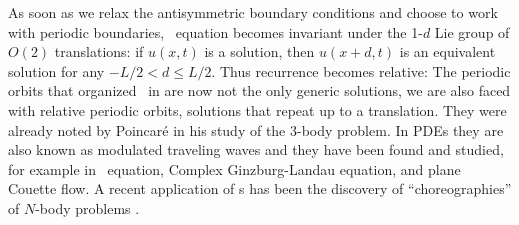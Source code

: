 %
As soon as
we relax the antisymmetric boundary conditions and choose to work with periodic boundaries,
\KS\ equation becomes invariant under the 1-$d$ Lie group of $O(2)$ translations: if
$u(x,t)$ is a solution, then $u(x+d,t)$ is an equivalent
solution for any $-L/2 < d \leq L/2$.
Thus recurrence becomes
relative: The periodic orbits that organized \statesp\ in
 are now not the
only generic  solutions, we are also faced with relative
periodic orbits, solutions that repeat up to a
translation.
They were already noted by Poincar\'e in his study of the
3-body problem. In PDEs they are also
known as modulated traveling waves and they have been found and
studied, for example in \KS\ equation, Complex
Ginzburg-Landau equation, and plane Couette
flow. A recent application of \rpo s has
been the discovery of ``choreographies'' of $N$-body problems%
.

